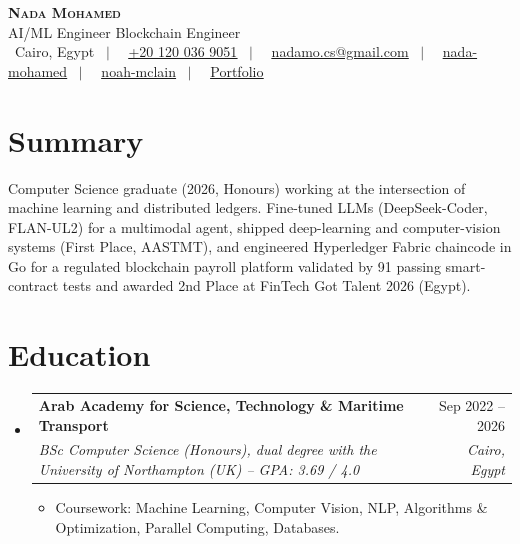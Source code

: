 \documentclass[letterpaper,11pt]{article}
\makeatletter
\newcommand{\resumeItem}[1]{
  \item\small{
    {#1 \vspace{-2pt}}
  }
}
\newcommand{\resumeSubheading}[4]{
  \vspace{-2pt}\item
    \begin{tabular*}{\textwidth}[t]{l@{\extracolsep{\fill}}r}
      \textbf{#1} & #2 \\
      \textit{\small#3} & \textit{\small #4} \\
    \end{tabular*}\vspace{-7pt}
}
\newcommand{\resumeSubHeadingListStart}{\begin{itemize}[leftmargin=0in, label={}]}
\newcommand{\resumeSubHeadingListEnd}{\end{itemize}}
\newcommand{\resumeItemListStart}{\begin{itemize}[leftmargin=0.2in, itemsep=0pt, parsep=0pt]}
\newcommand{\resumeItemListEnd}{\end{itemize}\vspace{-5pt}}
\makeatother
\begin{document}
\begin{center}
    \textbf{\Huge \scshape Nada Mohamed} \\ \vspace{1pt}
    AI/ML Engineer \textbullet{} Blockchain Engineer \\ \vspace{2pt}
    \small \faMapMarker\ Cairo, Egypt \ $|$ \
    \faPhone\ \href{tel:+201200369051}{\underline{+20 120 036 9051}} \ $|$ \
    \faEnvelope\ \href{mailto:nadamo.cs@gmail.com}{\underline{nadamo.cs@gmail.com}} \ $|$ \
    \faLinkedin\ \href{https://www.linkedin.com/in/nada-mohamed-300305ma}{\underline{nada-mohamed}} \ $|$ \
    \faGithub\ \href{https://github.com/noah-mclain}{\underline{noah-mclain}} \ $|$ \
    \faGlobe\ \href{https://noah-mclain.github.io/portfolio-site/}{\underline{Portfolio}}
\end{center}


\section{Summary}
\small{Computer Science graduate (2026, Honours) working at the intersection of machine learning and distributed ledgers.
Fine-tuned LLMs (DeepSeek-Coder, FLAN-UL2) for a multimodal agent, shipped deep-learning and computer-vision systems
(First Place, AASTMT), and engineered Hyperledger Fabric chaincode in Go for a regulated blockchain payroll platform
validated by 91 passing smart-contract tests and awarded 2nd Place at FinTech Got Talent 2026 (Egypt).}


\section{Education}
  \resumeSubHeadingListStart
    \resumeSubheading
      {Arab Academy for Science, Technology \& Maritime Transport}{Sep 2022 -- 2026}
      {BSc Computer Science (Honours), dual degree with the University of Northampton (UK) \textup{-- GPA: 3.69 / 4.0}}{Cairo, Egypt}
      \resumeItemListStart
        \resumeItem{Coursework: Machine Learning, Computer Vision, NLP, Algorithms \& Optimization, Parallel Computing, Databases.}
      \resumeItemListEnd
  \resumeSubHeadingListEnd


\end{document}
